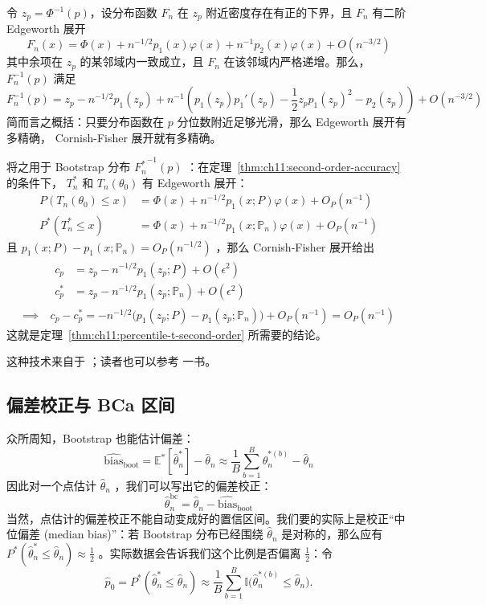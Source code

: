 \begin{theorem}

令 $z_p=\Phi^{-1}(p)$，设分布函数 $F_n$ 在 $z_p$ 附近密度存在有正的下界，且 $F_n$ 有二阶 Edgeworth 展开
\[F_n(x)=\Phi(x)+n^{-1/2}p_1(x)\varphi(x)+n^{-1}p_2(x)\varphi(x)+O(n^{-3/2})\]
其中余项在 $z_p$ 的某邻域内一致成立，且 $F_n$ 在该邻域内严格递增。那么， $F_n^{-1}(p)$ 满足
\[F_n^{-1}(p) = z_p -n^{-1/2}p_1(z_p) +n^{-1} \left( p_1(z_p)p_1'(z_p) -\frac12 z_p p_1(z_p)^2 -p_2(z_p) \right) +O(n^{-3/2})\]
简而言之概括：只要分布函数在 $p$ 分位数附近足够光滑，那么 Edgeworth 展开有多精确， Cornish-Fisher 展开就有多精确。

将之用于 Bootstrap 分布 ${F_n^*}^{-1}(p)$ ：在定理~\ref{thm:ch11:second-order-accuracy} 的条件下， $T_n^*$ 和 $T_n(\theta_0)$ 有 Edgeworth 展开：
\[\begin{aligned} P(T_n(\theta_0)\le x) &= \Phi(x)+n^{-1/2}p_1(x;P)\varphi(x)  +O_P(n^{-1})\\ P^*(T_n^*\le x) &= \Phi(x)+n^{-1/2}p_1(x;\mathbb P_n)\varphi(x) +O_P(n^{-1}) \end{aligned}\]
且 $p_1(x;P)-p_1(x;\mathbb P_n)=O_P(n^{-1/2})$ ，那么 Cornish-Fisher 展开给出
\[\begin{aligned} & \begin{aligned} c_p &= z_p-n^{-1/2} p_1(z_p;P) +O(\epsilon^2)\\ c^*_p &= z_p-n^{-1/2}p_1(z_p;\mathbb P_n) +O(\epsilon^2) \end{aligned}\\ \implies\ & c_p-c_p^*=-n^{-1/2}\big(p_1(z_p;P) -p_1(z_p;\mathbb P_n) \big)+O_P(n^{-1}) =O_P(n^{-1}) \end{aligned}\]
这就是定理~\ref{thm:ch11:percentile-t-second-order} 所需要的结论。

\end{theorem}

这种技术来自于 \cite{hall1986}；读者也可以参考 \cite{hall1992} 一书。

\subsection{偏差校正与 BCa 区间}

众所周知，Bootstrap 也能估计偏差：
\[\widehat{\mathrm{bias}}_{\mathrm{boot}} =\mathbb E^*[\widehat\theta_n^*]-\widehat\theta_n \approx \frac1B\sum_{b=1}^B\widehat\theta_n^{*(b)} -\widehat\theta_n\]
因此对一个点估计 $\widehat\theta_n$ ，我们可以写出它的偏差校正：
\[\widehat\theta_n^{\mathrm{bc}} =\widehat\theta_n-\widehat{\mathrm{bias}}_{\mathrm{boot}}\]
当然，点估计的偏差校正不能自动变成好的置信区间。我们要的实际上是校正``中位偏差 (median bias)''：若 Bootstrap 分布已经围绕 $\widehat\theta_n$ 是对称的，那么应有 $P^*(\widehat\theta_n^*\le \widehat\theta_n)\approx \tfrac12$ 。实际数据会告诉我们这个比例是否偏离 $\tfrac12$：令
\[
\widehat p_0 = P^*(\widehat\theta_n^*\le \widehat\theta_n) \approx \frac1B\sum_{b=1}^B\mathbb I\Big(\widehat\theta_n^{*(b)}\le \widehat\theta_n\Big).
\]

